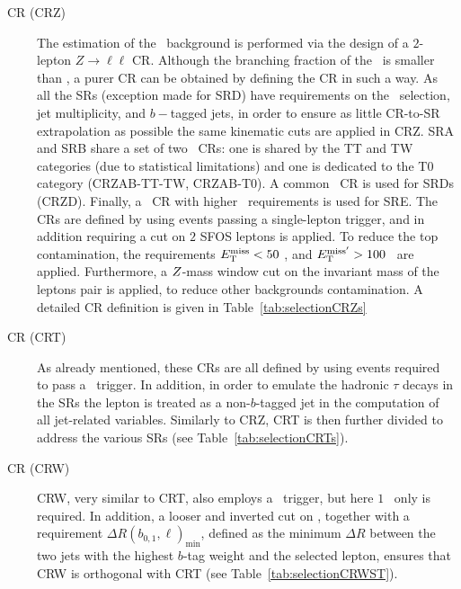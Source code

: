 			\begin{description}

				\item [\Zjets\ CR (CRZ)] The estimation of the \Znunu\ background is performed via the design of a $2$-lepton $Z \rightarrow \ell \ell$ \ac{CR}. Although the branching fraction of the \Zll\ is smaller than \Znunu, a purer \ac{CR} can be obtained by defining the \ac{CR} in such a way. As all the \acp{SR} (exception made for SRD) have requirements on the \MET\ selection, jet multiplicity, and $b-$tagged jets, in order to ensure as little \ac{CR}-to-\ac{SR} extrapolation as possible the same kinematic cuts are applied in CRZ. SRA and SRB share a set of two \Zboson\ \acp{CR}: one is shared by the TT and TW categories (due to statistical limitations) and one is dedicated to the T0 category (CRZAB-TT-TW, CRZAB-T0). A common \Zboson\ \ac{CR} is used for SRDs (CRZD). Finally, a \Zboson\ \ac{CR} with higher \HT\ requirements is used for SRE. The \acp{CR} are defined by using events passing a single-lepton trigger, and in addition requiring a cut on $2$ \acl{SFOS} leptons is applied. To reduce the top contamination, the requirements $E_{\mathrm{T}}^{\mathrm{miss}} < 50$ \GeV, and  $E_{\mathrm{T}}^{\mathrm{miss'}} > 100$ \GeV\ are applied. Furthermore, a $Z$-mass window cut on the invariant mass of the leptons pair is applied, to reduce other backgrounds contamination. A detailed \ac{CR} definition is given in Table~\ref{tab:selectionCRZs}

		
				\item [\ttbar\ CR (CRT)] As already mentioned, these \acp{CR} are all defined by using events required to pass a \met\ trigger. In addition, in order to emulate the hadronic $\tau$ decays in the \acp{SR} the lepton is treated as a non-$b$-tagged jet in the computation of all jet-related variables. Similarly to CRZ, CRT is then further divided to address the various \acp{SR} (see Table~\ref{tab:selectionCRTs}).

				\item [\Wjets\ CR (CRW)] CRW, very similar to CRT, also employs a \met\ trigger, but here $1$ \bj\ only is required. In addition, a looser and inverted cut on \mantikttwelvezero, together with a requirement $\Delta R(b_{0,1},\ell)_{\mathrm{min}}$, defined as the minimum $\Delta R$ between the two jets with the highest $b$-tag weight and the selected lepton, ensures that CRW is orthogonal with CRT (see Table~\ref{tab:selectionCRWST}). 


\end{description}
